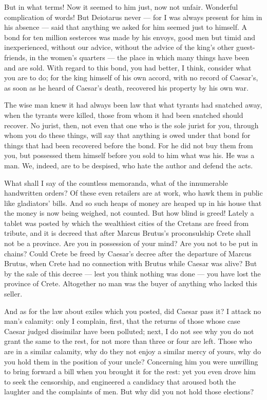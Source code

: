  But in what terms! Now it seemed to him just, now not unfair. Wonderful complication of words! But Deiotarus never --- for I was always present for him in his absence --- said that anything we asked for him seemed just to himself. A bond for ten million sesterces was made by his envoys, good men but timid and inexperienced, without our advice, without the advice of the king's other guest-friends, in the women's quarters --- the place in which many things have been and are sold. With regard to this bond, you had better, I think, consider what you are to do; for the king himself of his own accord, with no record of Caesar's, as soon as he heard of Caesar's death, recovered his property by his own war.

 The wise man knew it had always been law that what tyrants had snatched away, when the tyrants were killed, those from whom it had been snatched should recover. No jurist, then, not even that one who is the sole jurist for you, through whom you do these things, will say that anything is owed under that bond for things that had been recovered before the bond. For he did not buy them from you, but possessed them himself before you sold to him what was his. He was a man. We, indeed, are to be despised, who hate the author and defend the acts.

 What shall I say of the countless memoranda, what of the innumerable handwritten orders? Of these even retailers are at work, who hawk them in public like gladiators' bills. And so such heaps of money are heaped up in his house that the money is now being weighed, not counted. But how blind is greed! Lately a tablet was posted by which the wealthiest cities of the Cretans are freed from tribute, and it is decreed that after Marcus Brutus's proconsulship Crete shall not be a province. Are you in possession of your mind? Are you not to be put in chains? Could Crete be freed by Caesar's decree after the departure of Marcus Brutus, when Crete had no connection with Brutus while Caesar was alive? But by the sale of this decree --- lest you think nothing was done --- you have lost the province of Crete. Altogether no man was the buyer of anything who lacked this seller.

 And as for the law about exiles which you posted, did Caesar pass it? I attack no man's calamity: only I complain, first, that the returns of those whose case Caesar judged dissimilar have been polluted; next, I do not see why you do not grant the same to the rest, for not more than three or four are left. Those who are in a similar calamity, why do they not enjoy a similar mercy of yours, why do you hold them in the position of your uncle? Concerning him you were unwilling to bring forward a bill when you brought it for the rest: yet you even drove him to seek the censorship, and engineered a candidacy that aroused both the laughter and the complaints of men. But why did you not hold those elections?


